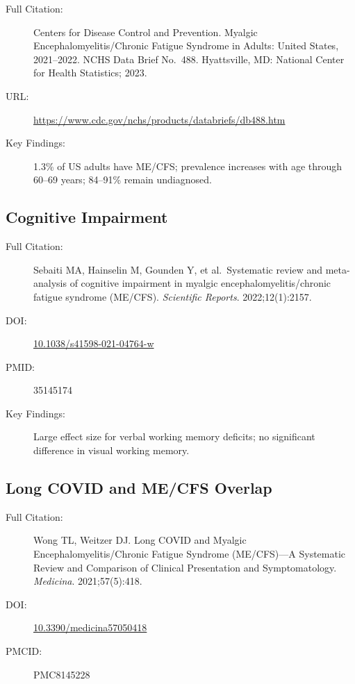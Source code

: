 \begin{description}
    \item[Full Citation:] Centers for Disease Control and Prevention. Myalgic Encephalomyelitis/Chronic Fatigue Syndrome in Adults: United States, 2021--2022. NCHS Data Brief No.\ 488. Hyattsville, MD: National Center for Health Statistics; 2023.
    \item[URL:] \url{https://www.cdc.gov/nchs/products/databriefs/db488.htm}
    \item[Key Findings:] 1.3\% of US adults have ME/CFS; prevalence increases with age through 60--69 years; 84--91\% remain undiagnosed.
\end{description}

\subsection{Cognitive Impairment}

\begin{description}
    \item[Full Citation:] Sebaiti MA, Hainselin M, Gounden Y, et al.\ Systematic review and meta-analysis of cognitive impairment in myalgic encephalomyelitis/chronic fatigue syndrome (ME/CFS). \textit{Scientific Reports}. 2022;12(1):2157.
    \item[DOI:] \href{https://doi.org/10.1038/s41598-021-04764-w}{10.1038/s41598-021-04764-w}
    \item[PMID:] 35145174
    \item[Key Findings:] Large effect size for verbal working memory deficits; no significant difference in visual working memory.
\end{description}

\subsection{Long COVID and ME/CFS Overlap}

\begin{description}
    \item[Full Citation:] Wong TL, Weitzer DJ. Long COVID and Myalgic Encephalomyelitis/Chronic Fatigue Syndrome (ME/CFS)---A Systematic Review and Comparison of Clinical Presentation and Symptomatology. \textit{Medicina}. 2021;57(5):418.
    \item[DOI:] \href{https://doi.org/10.3390/medicina57050418}{10.3390/medicina57050418}
    \item[PMCID:] PMC8145228
\end{description}

